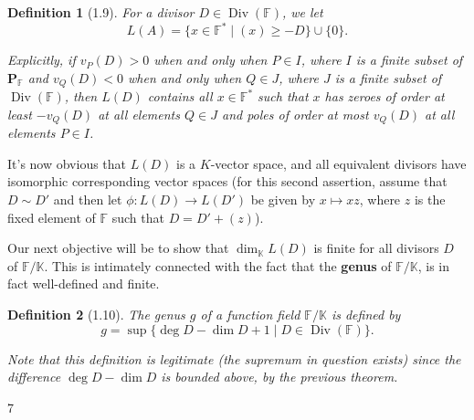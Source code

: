 \documentclass[11pt]{article}
\theoremstyle{scplain}
\newtheorem*{definition}{Definition}
\DeclareMathOperator{\Div}{Div}
\begin{document}
\begin{definition}[1.9]
For a divisor $D \in \Div(\mathbb{F})$, we let
\[
  L(A) = \{x \in \mathbb{F}^* \mid (x) \geq -D\} \cup \{0\}.
\]
\end{definition}

\noindent
\emph{Explicitly, if $v_P(D) > 0$ when and only when $P \in I$, where $I$ is a
finite subset of $\mathbf{P}_{\mathbb{F}}$ and $v_Q(D) < 0$ when and only when
$Q \in J$, where $J$ is a finite subset of $\Div(\mathbb{F})$, then $L(D)$ contains
all $x \in \mathbb{F}^*$ such that $x$ has zeroes of order at least $-v_Q(D)$ at
all elements $Q \in J$ and poles of order at most $v_Q(D)$ at all elements
$P \in I$.}

It's now obvious that $L(D)$ is a $K$-vector space, and all equivalent divisors
have isomorphic corresponding vector spaces (for this second assertion, assume
that $D \sim D'$ and then let $\phi : L(D) \longrightarrow L(D')$ be given by
$x \mapsto xz$, where $z$ is the fixed element of $\mathbb{F}$ such that
$D = D' + (z)$).

Our next objective will be to show that $\dim_{\mathbb{K}} L(D)$ is finite for all
divisors $D$ of $\mathbb{F}/\mathbb{K}$. This is intimately connected with the fact
that the \textbf{genus} of $\mathbb{F}/\mathbb{K}$, is in fact well-defined and
finite.

\begin{definition}[1.10]
The genus $g$ of a function field $\mathbb{F}/\mathbb{K}$ is defined by
\[
  g = \sup\{\deg D - \dim D + 1 \mid D \in \Div(\mathbb{F})\}.
\]
\end{definition}

\noindent
\emph{Note that this definition is legitimate (the supremum in question exists)
since the difference $\deg D - \dim D$ is bounded above, by the previous theorem.}

\begin{center}7\end{center}
\end{document}
